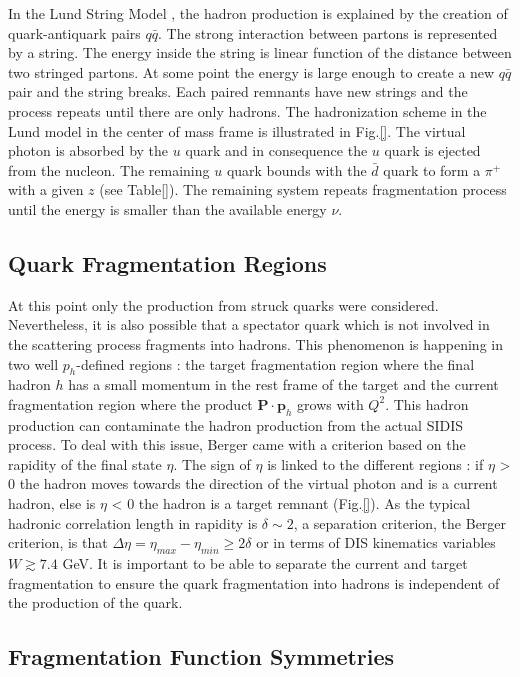 In the Lund String Model \cite{}, the hadron production is explained by the creation of quark-antiquark pairs $q\bar{q}$. The strong interaction between
partons is represented by a string. The energy inside the string is linear function of the distance between two stringed partons. At some point the
energy is large enough to create a new $q\bar{q}$ pair and the string breaks. Each paired remnants have new strings and the process repeats until there
are only hadrons. The hadronization scheme in the Lund model in the center of mass frame is illustrated in Fig.\ref{}. The virtual photon is absorbed by
the $u$ quark and in consequence the $u$ quark is ejected from the nucleon. The remaining $u$ quark bounds with the $\bar{d}$ quark to form a $\pi^+$
with a given $z$ (see Table\ref{}). The remaining system repeats fragmentation process until the energy is smaller than the available energy $\nu$.

\subsection*{Quark Fragmentation Regions}

At this point only the production from struck quarks were considered. Nevertheless, it is also possible that a spectator quark which is not involved in
the scattering process fragments into hadrons. This phenomenon is happening in two well $p_h$-defined regions : the target fragmentation region where
the final hadron $h$ has a small momentum in the rest frame of the target and the current fragmentation region where the product $\textbf{P}\cdot\textbf{p}_h$
grows with $Q^2$. This hadron production can contaminate the hadron production from the actual SIDIS process. To deal with this issue, Berger \cite{} came
with a criterion based on the rapidity of the final state $\eta$. The sign of $\eta$ is linked to the different regions : if $\eta$ > 0 the hadron moves
towards the direction of the virtual photon and is a current hadron, else is $\eta$ < 0 the hadron is a target remnant (Fig.\ref{}). As the typical hadronic
correlation length in rapidity is $\delta \sim 2$, a separation criterion, the Berger criterion, is that $\Delta\eta = \eta_{max}-\eta_{min} \geq 2\delta$
or in terms of DIS kinematics variables $W \gtrsim 7.4$ GeV. It is important to be able to separate the current and target fragmentation to ensure the quark
fragmentation into hadrons is independent of the production of the quark.

\subsection*{Fragmentation Function Symmetries}

